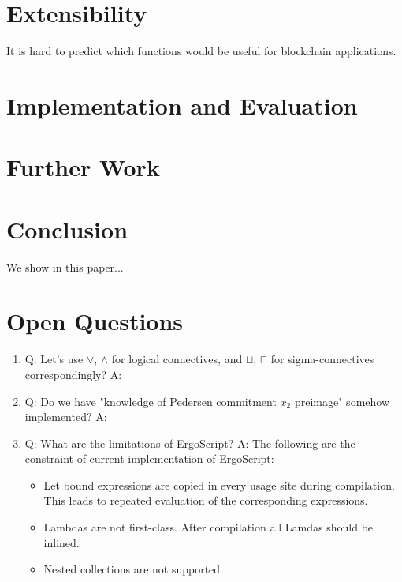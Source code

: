 \documentclass[11pt]{llncs}
\begin{document}
\section{Extensibility}

It is hard to predict which functions would be useful for blockchain applications.

\section{Implementation and Evaluation}

\section{Further Work}

\section{Conclusion}

We show in this paper...









\appendix

\section{Open Questions}

\begin{enumerate}
  \item Q: Let's use $\lor$, $\land$ for logical connectives, and $\sqcup$, $\sqcap$ for
           sigma-connectives correspondingly? \linebreak
        A:
  \item Q: Do we have "knowledge of Pedersen commitment $x_2$ preimage" somehow implemented? \linebreak
        A:
  \item Q: What are the limitations of ErgoScript? \linebreak
        A: The following are the constraint of current implementation of ErgoScript:
        \begin{itemize}
          \item Let bound expressions are copied in every usage site during compilation. This leads to repeated evaluation of the corresponding expressions.
          \item Lambdas are not first-class. After compilation all Lamdas should be inlined.
          \item Nested collections are not supported
        \end{itemize}
\end{enumerate}
\end{document}
